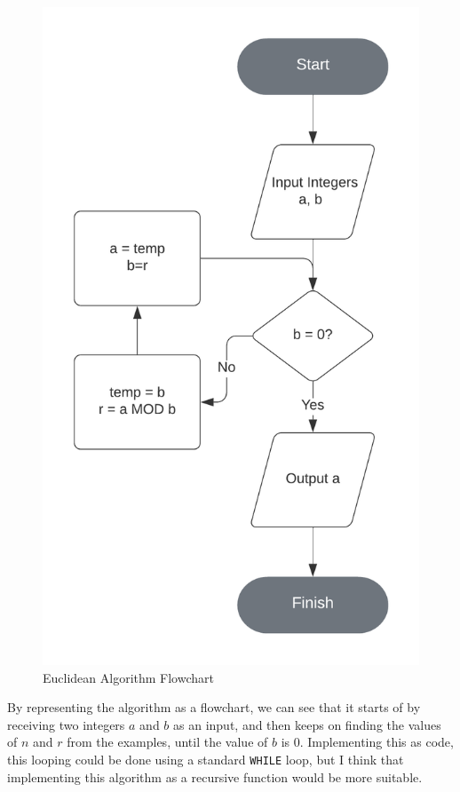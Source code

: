 \documentclass{article}
\begin{document}
\begin{figure}[h]
    \centering
    \caption{Euclidean Algorithm Flowchart}
    \captionsetup{justification=centering}
    \includegraphics[scale=0.6]{euclidean-algorithm-flowchart}
\end{figure}

By representing the algorithm as a flowchart, we can see that it starts of by receiving two integers $a$ and $b$ as an input, and then keeps on finding the values of $n$ and $r$ from the examples, until the value of $b$ is $0$. Implementing this as code, this looping could be done using a standard \texttt{WHILE} loop, but I think that implementing this algorithm as a recursive function would be more suitable.
\end{document}
